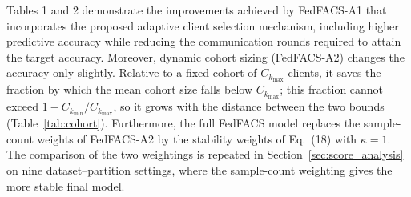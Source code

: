 \documentclass[pdflatex,sn-mathphys-num,oneside]{sn-jnl}%
\theoremstyle{thmstyleone}%
\theoremstyle{thmstyletwo}%
\theoremstyle{thmstylethree}%
\begin{document}
Tables 1 and 2 demonstrate the improvements achieved by FedFACS-A1 that incorporates the proposed adaptive client selection mechanism, including higher predictive accuracy while reducing the communication rounds required to attain the target accuracy. Moreover, dynamic cohort sizing (FedFACS-A2) changes the accuracy only slightly. Relative to a fixed cohort of $C_{k_{\max}}$ clients, it saves the fraction by which the mean cohort size falls below $C_{k_{\max}}$; this fraction cannot exceed $1-C_{k_{\min}}/C_{k_{\max}}$, so it grows with the distance between the two bounds (Table~\ref{tab:cohort}). Furthermore, the full FedFACS model replaces the sample-count weights of FedFACS-A2 by the stability weights of Eq.~(18) with $\kappa=1$. The comparison of the two weightings is repeated in Section~\ref{sec:score_analysis} on nine dataset--partition settings, where the sample-count weighting gives the more stable final model.

\FloatBarrier

\FloatBarrier
\end{document}
